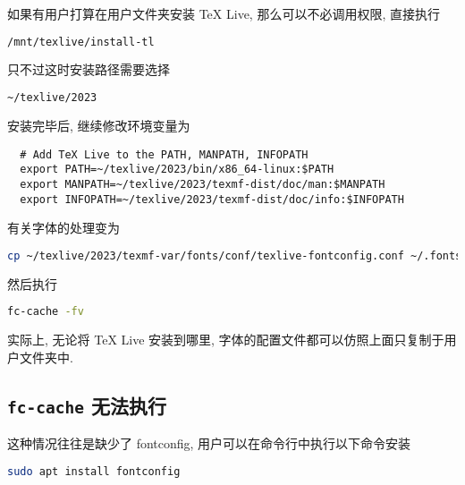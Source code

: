 如果有用户打算在用户文件夹安装 \TeX{} Live,
那么可以不必调用权限,
直接执行
\begin{lstlisting}[language=bash]
  /mnt/texlive/install-tl
\end{lstlisting}
只不过这时安装路径需要选择
\begin{lstlisting}[language=bash]
  ~/texlive/2023
\end{lstlisting}
安装完毕后,
继续修改环境变量为
\begin{lstlisting}
  # Add TeX Live to the PATH, MANPATH, INFOPATH
  export PATH=~/texlive/2023/bin/x86_64-linux:$PATH
  export MANPATH=~/texlive/2023/texmf-dist/doc/man:$MANPATH
  export INFOPATH=~/texlive/2023/texmf-dist/doc/info:$INFOPATH
\end{lstlisting}
有关字体的处理变为
\begin{lstlisting}[language=bash]
  cp ~/texlive/2023/texmf-var/fonts/conf/texlive-fontconfig.conf ~/.fonts.conf/09-texlive.conf
\end{lstlisting}
然后执行
\begin{lstlisting}[language=bash]
  fc-cache -fv
\end{lstlisting}
实际上,
无论将 \TeX{} Live 安装到哪里,
字体的配置文件都可以仿照上面只复制于用户文件夹中.

\subsection{\texttt{fc-cache} 无法执行}\label{subsec:fc-cache}

这种情况往往是缺少了 fontconfig,
用户可以在命令行中执行以下命令安装
\begin{lstlisting}[language=bash]
  sudo apt install fontconfig
\end{lstlisting}

